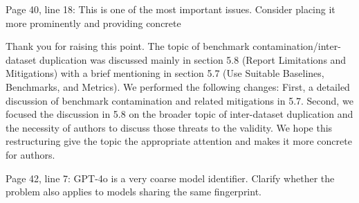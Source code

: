 \documentclass[12pt,english]{reviewresponse}
\begin{document}
\begin{revcomment}
Page 40, line 18: This is one of the most important issues. Consider placing it more prominently and providing concrete
\end{revcomment}
\begin{revresponse}
    Thank you for raising this point. The topic of benchmark contamination/inter-dataset duplication was discussed mainly in section 5.8 (Report Limitations and Mitigations) with a brief mentioning in section 5.7 (Use Suitable Baselines, Benchmarks, and Metrics). We performed the following changes: First, a detailed discussion of benchmark contamination and related mitigations in 5.7. Second, we focused the discussion in 5.8 on the broader topic of inter-dataset duplication and the necessity of authors to discuss those threats to the validity. We hope this restructuring give the topic the appropriate attention and makes it more concrete for authors.
\end{revresponse}

\begin{revcomment}
Page 42, line 7: GPT-4o is a very coarse model identifier. Clarify whether the problem also applies to models sharing the same fingerprint.
\end{revcomment}
\begin{revresponse}
\end{revresponse}
\end{document}
